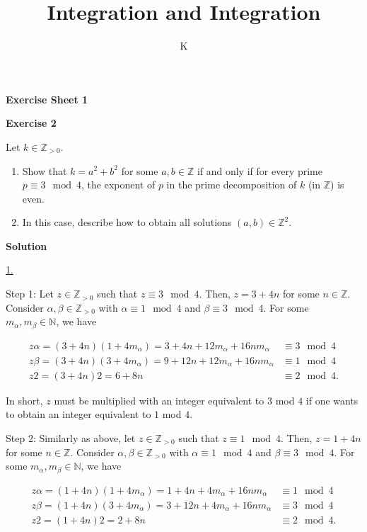 \documentclass[a4paper]{article}
\title{Integration and Integration}
\author{K}
\theoremstyle{definition}
\begin{document}
\begin{center}
    \noindent\textbf{Exercise Sheet 1}
\end{center}
\noindent\textbf{Exercise 2}

Let \(k \in \mathbb{Z}_{>0}\).
\begin{enumerate}
    \item Show that \(k = a^2 + b^2\) for some \(a, b \in \mathbb{Z}\) if and only if for every prime \(p \equiv 3 \mod 4\), the exponent of \(p\) in the prime decomposition of \(k\) (in \(\mathbb{Z}\)) is even.
    \item In this case, describe how to obtain all solutions \((a, b) \in \mathbb{Z}^2\).
\end{enumerate}

\noindent\textbf{Solution}

\noindent\underline{1.}

\noindent Step 1: Let \(z \in \mathbb{Z}_{>0}\) such that \(z \equiv 3 \mod{4}\). Then, \(z = 3 + 4n\) for some \(n \in \mathbb{Z}\). Consider \(\alpha, \beta \in \mathbb{Z}_{>0}\) with \(\alpha \equiv 1 \mod{4}\) and \(\beta \equiv 3 \mod{4}\). For some \(m_\alpha, m_\beta \in \mathbb{N}\), we have

\begin{align}
    z \alpha = (3 + 4n)(1 + 4m_\alpha) = 3 + 4n + 12m_\alpha + 16nm_\alpha &\equiv 3 \mod{4} \\
    z \beta = (3 + 4n)(3 + 4m_\alpha) = 9 + 12n + 12m_\alpha + 16nm_\alpha &\equiv 1 \mod{4} \\
    z 2 = (3 + 4n) 2 = 6 + 8n &\equiv 2 \mod{4} \text{.}
\end{align}

In short, \(z\) must be multiplied with an integer equivalent to \(3\) mod \(4\) if one wants to obtain an integer equivalent to \(1\) mod \(4\).

\noindent Step 2: Similarly as above, let \(z \in \mathbb{Z}_{>0}\) such that \(z \equiv 1 \mod{4}\). Then, \(z = 1 + 4n\) for some \(n \in \mathbb{Z}\). Consider \(\alpha, \beta \in \mathbb{Z}_{>0}\) with \(\alpha \equiv 1 \mod{4}\) and \(\beta \equiv 3 \mod{4}\). For some \(m_\alpha, m_\beta \in \mathbb{N}\), we have

\begin{align}
    z \alpha = (1 + 4n)(1 + 4m_\alpha) = 1 + 4n + 4m_\alpha + 16nm_\alpha &\equiv 1 \mod{4} \\
    z \beta = (1 + 4n)(3 + 4m_\alpha) = 3 + 12n + 4m_\alpha + 16nm_\alpha &\equiv 3 \mod{4} \\
    z 2 = (1 + 4n) 2 = 2 + 8n &\equiv 2 \mod{4} \text{.}
\end{align}
\end{document}
